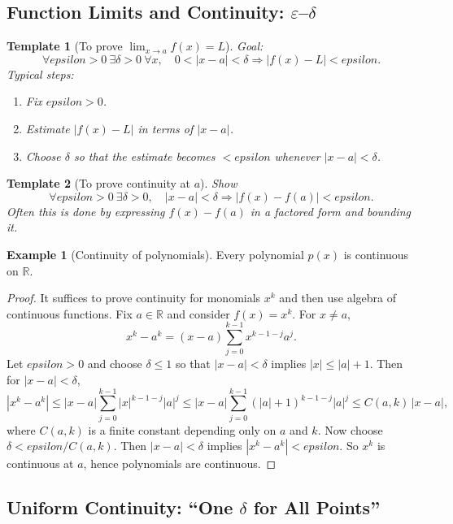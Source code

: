 \documentclass[12pt]{article}
\numberwithin{equation}{section}
\def\eps{epsilon}
\newcommand{\RR}{\mathbb{R}}
\newcommand{\eps}{\varepsilon}               %
\theoremstyle{plain}
\newtheorem{template}{Template}[section]
\theoremstyle{definition}
\newtheorem{example}[theorem]{Example}
\theoremstyle{remark}
\begin{document}
\subsection{Function Limits and Continuity: $\varepsilon$--$\delta$}

\begin{template}[To prove $\lim_{x\to a} f(x)=L$]\label{tmp:func-limit}
Goal:
\[
\forall \eps>0\ \exists \delta>0\ \forall x,\quad 0<|x-a|<\delta \Rightarrow |f(x)-L|<\eps.
\]
Typical steps:
\begin{enumerate}[label=(\arabic*)]
\item Fix $\eps>0$.
\item Estimate $|f(x)-L|$ in terms of $|x-a|$.
\item Choose $\delta$ so that the estimate becomes $<\eps$ whenever $|x-a|<\delta$.
\end{enumerate}
\end{template}

\begin{template}[To prove continuity at $a$]\label{tmp:continuity}
Show
\[
\forall \eps>0\ \exists \delta>0,\quad |x-a|<\delta \Rightarrow |f(x)-f(a)|<\eps.
\]
Often this is done by expressing $f(x)-f(a)$ in a factored form and bounding it.
\end{template}

\begin{example}[Continuity of polynomials]\label{ex:app_poly_cont}
Every polynomial $p(x)$ is continuous on $\RR$.
\end{example}

\begin{proof}
It suffices to prove continuity for monomials $x^k$ and then use algebra of continuous functions.
Fix $a\in\RR$ and consider $f(x)=x^k$.
For $x\neq a$,
\[
x^k-a^k=(x-a)\sum_{j=0}^{k-1}x^{k-1-j}a^j.
\]
Let $\eps>0$ and choose $\delta\le 1$ so that $|x-a|<\delta$ implies $|x|\le |a|+1$.
Then for $|x-a|<\delta$,
\[
|x^k-a^k|
\le |x-a|\sum_{j=0}^{k-1}|x|^{k-1-j}|a|^j
\le |x-a|\sum_{j=0}^{k-1}(|a|+1)^{k-1-j}|a|^j
\le C(a,k)\,|x-a|,
\]
where $C(a,k)$ is a finite constant depending only on $a$ and $k$.
Now choose $\delta<\eps/C(a,k)$. Then $|x-a|<\delta$ implies $|x^k-a^k|<\eps$.
So $x^k$ is continuous at $a$, hence polynomials are continuous.
\end{proof}

\subsection{Uniform Continuity: ``One $\delta$ for All Points''}
\end{document}
